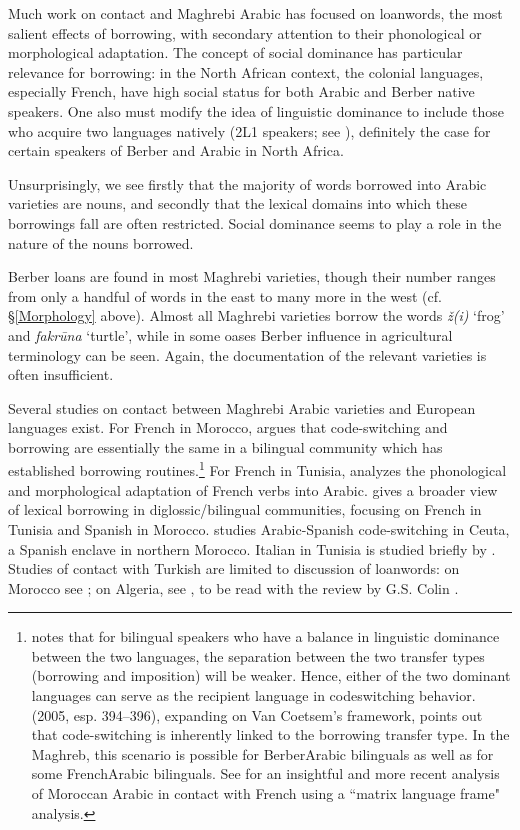 \documentclass[output=paper]{langsci/langscibook}
\begin{document}
Much work on contact and Maghrebi Arabic has focused on loanwords, the most salient effects of borrowing, with secondary attention to their phonological or morphological adaptation. The concept of social dominance has particular relevance for borrowing: in the North African context, the colonial languages, especially French, have high social status for both Arabic and Berber native speakers. One also must modify the idea of linguistic dominance to include those who acquire two languages natively (2L1 speakers; see \citealt[525]{Lucas2015}), definitely the case for certain speakers of Berber and Arabic in North Africa. 

  Unsurprisingly, we see firstly that the majority of words borrowed into Arabic varieties are nouns, and secondly that the lexical domains into which these borrowings fall are often restricted. Social dominance seems to play a role in the nature of the nouns borrowed.

  Berber loans are found in most Maghrebi varieties, though their number ranges from only a handful of words in the east to many more in the west (cf. §\ref{Morphology} above). Almost all Maghrebi varieties borrow the words \textit{ž(i)} ‘frog’ and \textit{fakrūna} ‘turtle’, while in some oases Berber influence in agricultural terminology can be seen. Again, the documentation of the relevant varieties is often insufficient.

Several studies on contact between Maghrebi Arabic varieties and European languages exist. For French in Morocco, \citet{Heath1989} argues that code-switching and borrowing are essentially the same in a bilingual community which has established borrowing routines.\footnote{\citet[87]{VanCoetsem1988} notes that for bilingual speakers who have a balance in linguistic dominance between the two languages, the separation between the two transfer types (borrowing and imposition) will be weaker. Hence, either of the two dominant languages can serve as the recipient language in codeswitching behavior. \citeauthor{Winford2005} (2005, esp. 394–396), expanding on Van Coetsem’s framework, points out that code-switching is inherently linked to the borrowing transfer type. In the Maghreb, this scenario is possible for Berber\textendash Arabic bilinguals as well as for some French\textendash Arabic bilinguals. See \citet{Ziamari2008} for an insightful and more recent analysis of Moroccan Arabic in contact with French using a ``matrix language frame" analysis.} For French in Tunisia, \citet{Talmoudi1986} analyzes the phonological and morphological adaptation of French verbs into Arabic. \citet[127–151]{Sayahi2014} gives a broader view of lexical borrowing in diglossic/bilingual communities, focusing on French in Tunisia and Spanish in Morocco. \citet{Vicente2005} studies Arabic-Spanish code-switching in Ceuta, a Spanish enclave in northern Morocco. Italian in Tunisia is studied briefly by \citet{Cifoletti1994}. Studies of contact with Turkish are limited to discussion of loanwords: on Morocco see \citet{Procházka2012}; on Algeria, see \citet{BenCheneb1922}, to be read with the review by G.S. Colin \citep[21–30]{Colin1999}.
\end{document}
